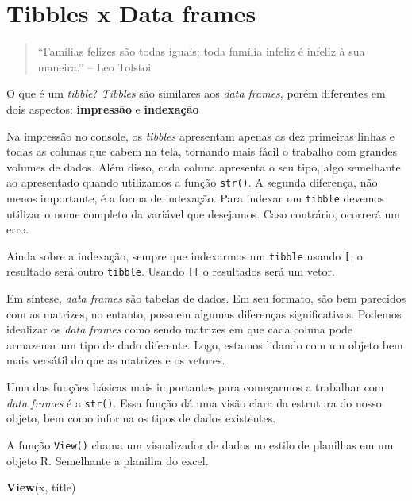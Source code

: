 \documentclass[]{book}
\newenvironment{Shaded}{\begin{snugshade}}{\end{snugshade}}
\newcommand{\KeywordTok}[1]{\textcolor[rgb]{0.13,0.29,0.53}{\textbf{#1}}}
\newcommand{\NormalTok}[1]{#1}
\begin{document}
\hypertarget{literature}{%
\chapter{Tibbles x Data frames}\label{literature}}

\begin{quote}
``Famílias felizes são todas iguais; toda família infeliz é infeliz à sua maneira.'' -- Leo Tolstoi
\end{quote}

O que é um \emph{tibble}? \emph{Tibbles} são similares aos \emph{data frames}, porém diferentes em dois aspectos: \textbf{impressão} e \textbf{indexação}

Na impressão no console, os \emph{tibbles} apresentam apenas as dez primeiras linhas e todas as colunas que cabem na tela, tornando mais fácil o trabalho com grandes volumes de dados. Além disso, cada coluna apresenta o seu tipo, algo semelhante ao apresentado quando utilizamos a função \texttt{str()}. A segunda diferença, não menos importante, é a forma de indexação. Para indexar um \texttt{tibble} devemos utilizar o nome completo da variável que desejamos. Caso contrário, ocorrerá um erro.

Ainda sobre a indexação, sempre que indexarmos um \texttt{tibble} usando \texttt{{[}}, o resultado será outro \texttt{tibble}. Usando \texttt{{[}{[}} o resultados será um vetor.

Em síntese, \emph{data frames} são tabelas de dados. Em seu formato, são bem parecidos com as matrizes, no entanto, possuem algumas diferenças significativas. Podemos idealizar os \emph{data frames} como sendo matrizes em que cada coluna pode armazenar um tipo de dado diferente. Logo, estamos lidando com um objeto bem mais versátil do que as matrizes e os vetores.

Uma das funções básicas mais importantes para começarmos a trabalhar com \emph{data frames} é a \texttt{str()}. Essa função dá uma visão clara da estrutura do nosso objeto, bem como informa os tipos de dados existentes.

A função \texttt{View()} chama um visualizador de dados no estilo de planilhas em um objeto R. Semelhante a planilha do excel.

\begin{Shaded}
\begin{Highlighting}[]
\KeywordTok{View}\NormalTok{(x, title)}
\end{Highlighting}
\end{Shaded}
\end{document}

